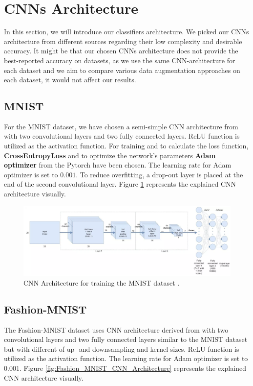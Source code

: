\section{CNNs Architecture}
In this section, we will introduce our classifiers architecture. We picked our CNNs architecture from
different sources regarding their low complexity and desirable accuracy.  It might be that our chosen
CNNs architecture does not provide the best-reported accuracy on datasets, as we use the
same CNN-architecture for each dataset and we aim to compare various data augmentation approaches on
each dataset, it would not affect our results. 

\subsection{MNIST}
For the MNIST dataset, we have chosen a semi-simple CNN architecture from
\cite{MNIST_CNN_Architecture} with two
convolutional layers and two fully connected layers. ReLU function is utilized as the activation
function. For training and to calculate the loss function, \textbf{CrossEntropyLoss} and
to optimize the network's parameters \textbf{Adam optimizer} \cite{adam_optimizer} from the Pytorch have been
chosen. The learning rate for Adam optimizer is set to $0.001$. To reduce overfitting, a
drop-out layer is placed at the end of the second convolutional layer. Figure \ref{fig:MNIST_CNN_Architecture} represents the explained CNN architecture visually.

\begin{figure}
  \centering
  \label{fig:MNIST_CNN_Architecture}
  \includegraphics[width=1\textwidth]{fig/MNIST-CNN-Architecture}
  \caption{CNN Architecture for training the MNIST dataset \cite{MNIST_CNN_Architecture_Image}.}
\end{figure}


\subsection{Fashion-MNIST}
The Fashion-MNIST dataset uses CNN architecture derived from \cite{TODO} with two
convolutional layers and two fully connected layers similar to the MNIST dataset but with
different of up- and downsampling and kernel sizes. ReLU function is utilized as the activation
function. The learning rate for Adam optimizer is set to $0.001$. Figure \ref{fig:Fashion_MNIST_CNN_Architecture} represents the explained CNN architecture visually.

